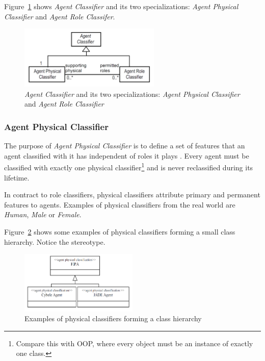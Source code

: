 Figure~\ref{figure:onp-agent-classifiers} shows \textit{Agent Classifier} and its two specializations: \textit{Agent Physical Classifier} and \textit{Agent Role Classifer}.

\begin{figure}[ht]
	\centering
	\includegraphics[width=0.6\textwidth]{images/onp/agent-classifiers.png}
	\caption{\textit{Agent Classifier} and its two specializations: \textit{Agent Physical Classifier} and \textit{Agent Role Classifier} \cite{Odell05}}
	\label{figure:onp-agent-classifiers}
\end{figure}

\subsubsection*{Agent Physical Classifier}

The purpose of \textit{Agent Physical Classifier} is to define a set of features that an agent classified with it has independent of roles it plays \cite{Odell05}.
Every agent must be classified with exactly one physical classifier\footnote{Compare this with OOP, where every object must be an instance of exactly one class.} and is never reclassified during its lifetime.

In contract to role classifiers, physical classifiers attribute primary and permanent features to agents.
Examples of physical classifiers from the real world are \textit{Human}, \textit{Male} or \textit{Female}.

Figure~\ref{figure:onp-physical-classifier-examples} shows some examples of physical classifiers forming a small class hierarchy.
Notice the  stereotype.

\begin{figure}[ht]
	\centering
	\includegraphics[width=0.5\textwidth]{images/onp/physical-classifier-examples.png}
	\caption{Examples of physical classifiers forming a class hierarchy \cite{Odell05}}
	\label{figure:onp-physical-classifier-examples}
\end{figure}

